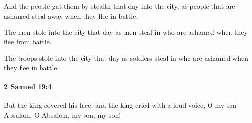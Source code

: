 			\begin{versebox}
					\item[BHS] 
					\item[ASV] And the people gat them by stealth that day into the city, as people that are ashamed steal away when they flee in battle.
					\item[NIV] The men stole into the city that day as men steal in who are ashamed when they flee from battle.
					\item[NRSV] The troops stole into the city that day as soldiers steal in who are ashamed when they flee in battle.
			\end{versebox}

		\paragraph{2 Samuel 19:4} %
			\label{2SAMUEL-19-4}

			But the king covered his face, and the king cried with a loud voice, O my son Absalom, O Absalom, my son, my son!

